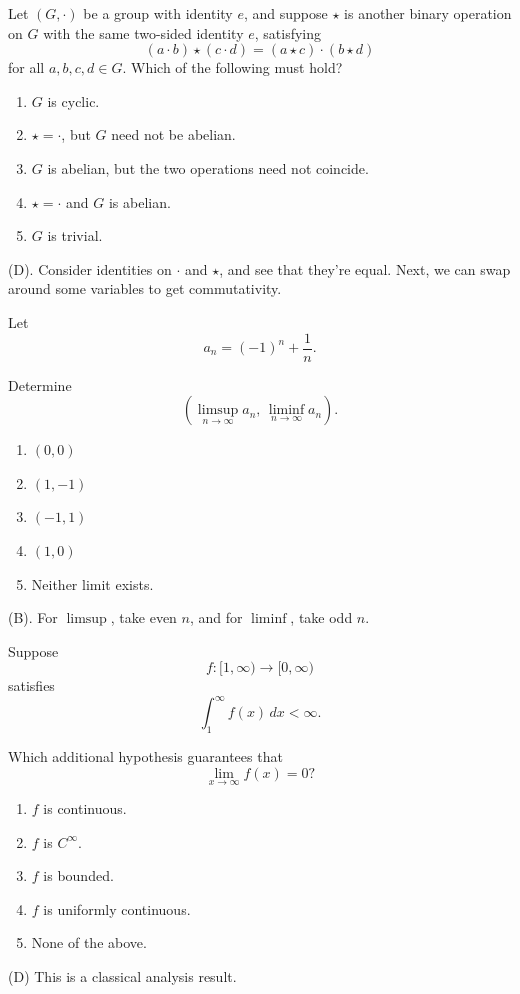 \begin{exercise}
Let $(G,\cdot)$ be a group with identity $e$,
and suppose $\star$ is another binary
operation on $G$ with the same two-sided
identity $e$, satisfying
\[
(a\cdot b)\star(c\cdot d)
=
(a\star c)\cdot(b\star d)
\]
for all $a,b,c,d\in G$. Which of the following must hold?
\begin{enumerate}[label=(\Alph*)]
    \item $G$ is cyclic.
    \item $\star=\cdot$, but $G$ need not
          be abelian.
    \item $G$ is abelian, but the two
          operations need not coincide.
    \item $\star=\cdot$ and $G$ is abelian.
    \item $G$ is trivial.
\end{enumerate}
\end{exercise}
\begin{solution}
(D). Consider identities on $\cdot$ and $\star$, and see that they're equal. 
Next, we can swap around some variables to get commutativity.
\end{solution}

\begin{exercise}
Let
\[
a_n=(-1)^n+\frac1n.
\]

Determine
\[
\left(
\limsup_{n\to\infty}a_n,\,
\liminf_{n\to\infty}a_n
\right).
\]

\begin{enumerate}[label=(\Alph*)]
    \item $(0,0)$
    \item $(1,-1)$
    \item $(-1,1)$
    \item $(1,0)$
    \item Neither limit exists.
\end{enumerate}
\end{exercise}
\begin{solution}
(B). For $\limsup$, take even $n$, and for $\liminf$, take odd $n$.
\end{solution}

\begin{exercise}
Suppose
\[
f:[1,\infty)\to[0,\infty)
\]
satisfies
\[
\int_1^\infty f(x)\,dx<\infty.
\]

Which additional hypothesis guarantees
that
\[
\lim_{x\to\infty}f(x)=0?
\]

\begin{enumerate}[label=(\Alph*)]
    \item $f$ is continuous.
    \item $f$ is $C^\infty$.
    \item $f$ is bounded.
    \item $f$ is uniformly continuous.
    \item None of the above.
\end{enumerate}
\end{exercise}
\begin{solution}
(D) This is a classical analysis result.
\end{solution}

